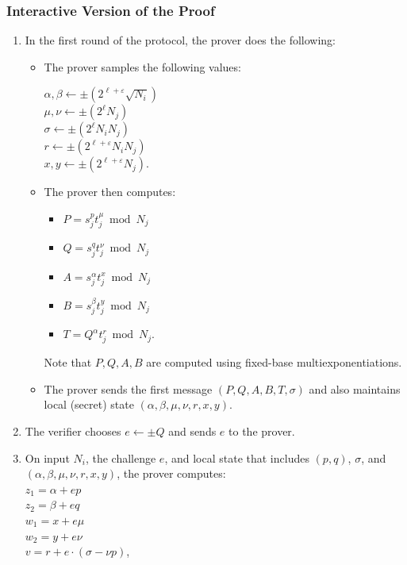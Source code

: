 \documentclass[11pt]{article}
\newcommand{\?}[1]{\stackrel{?}{#1}}
\begin{document}
\subsubsection{Interactive Version of the Proof}
\begin{enumerate}
  \item In the first round of the protocol, the prover does the following:

    \begin{itemize}
      \item The prover samples the following values:

        $\alpha, \beta \gets \pm \left(2^{\ell + \varepsilon} \sqrt{N_i}\right)$ \\
        $\mu, \nu \gets \pm \left(2^{\ell} N_j\right)$ \\
        $\sigma \gets \pm \left(2^{\ell} N_i N_j\right)$ \\
        $r \gets \pm \left(2^{\ell + \varepsilon} N_i N_j\right)$ \\
        $x, y \gets \pm \left(2^{\ell + \varepsilon} N_j\right)$.

      \item The prover then computes:
\begin{itemize}
\item        $P = s_j^{p} t_j^\mu \bmod N_j$ 
\item        $Q = s_j^{q} t_j^\nu \bmod N_j$ 
\item        $A = s_j^\alpha t_j^x \bmod N_j$ 
\item        $B = s_j^\beta t_j^y \bmod N_j$ 
\item        $T = Q^\alpha t_j^r \bmod N_j$.
 \end{itemize}
 Note that $P,Q,A,B$ are computed using fixed-base multiexponentiations. %
      \item The prover sends the first message  $(P, Q, A, B, T, \sigma)$ 
        and also maintains local (secret) state $(\alpha, \beta, \mu, \nu, r, x, y)$.
    \end{itemize}

  \item The verifier chooses $e \leftarrow \pm Q$ and sends $e$ to the prover.

  \item On input $N_i$, the challenge $e$, and local state that includes $(p, q)$, $\sigma$, and 
  $(\alpha, \beta, \mu, \nu, r, x, y)$, the prover computes: \\
    $z_1 = \alpha + ep$ \\
    $z_2 = \beta + eq$ \\
    $w_1 = x + e\mu$ \\
    $w_2 = y + e\nu$ \\
    $v = r + e \cdot (\sigma - \nu p)$,


\end{enumerate}
\end{document}
